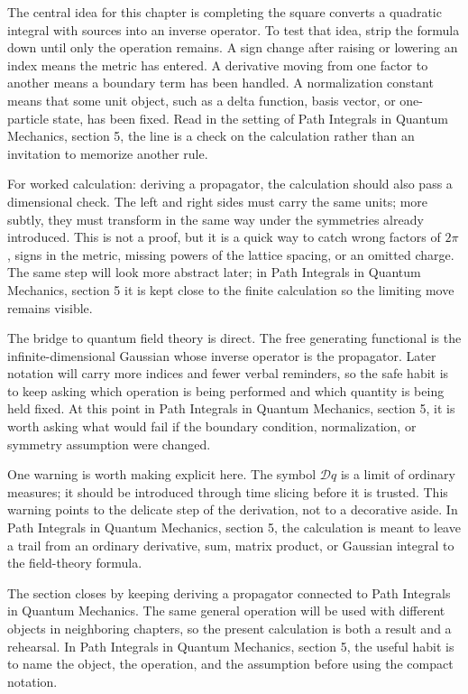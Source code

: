 The central idea for this chapter is completing the square converts a quadratic integral with sources into an inverse operator.  To test that idea, strip the formula down until only the operation remains.  A sign change after raising or lowering an index means the metric has entered.  A derivative moving from one factor to another means a boundary term has been handled.  A normalization constant means that some unit object, such as a delta function, basis vector, or one-particle state, has been fixed.  Read in the setting of Path Integrals in Quantum Mechanics, section 5, the line is a check on the calculation rather than an invitation to memorize another rule.

For worked calculation: deriving a propagator, the calculation should also pass a dimensional check.  The left and right sides must carry the same units; more subtly, they must transform in the same way under the symmetries already introduced.  This is not a proof, but it is a quick way to catch wrong factors of \(2\pi\), signs in the metric, missing powers of the lattice spacing, or an omitted charge.  The same step will look more abstract later; in Path Integrals in Quantum Mechanics, section 5 it is kept close to the finite calculation so the limiting move remains visible.

The bridge to quantum field theory is direct.  The free generating functional is the infinite-dimensional Gaussian whose inverse operator is the propagator.  Later notation will carry more indices and fewer verbal reminders, so the safe habit is to keep asking which operation is being performed and which quantity is being held fixed.  At this point in Path Integrals in Quantum Mechanics, section 5, it is worth asking what would fail if the boundary condition, normalization, or symmetry assumption were changed.

One warning is worth making explicit here.  The symbol \(\mathcal D q\) is a limit of ordinary measures; it should be introduced through time slicing before it is trusted.  This warning points to the delicate step of the derivation, not to a decorative aside.  In Path Integrals in Quantum Mechanics, section 5, the calculation is meant to leave a trail from an ordinary derivative, sum, matrix product, or Gaussian integral to the field-theory formula.

The section closes by keeping deriving a propagator connected to Path Integrals in Quantum Mechanics.  The same general operation will be used with different objects in neighboring chapters, so the present calculation is both a result and a rehearsal.  In Path Integrals in Quantum Mechanics, section 5, the useful habit is to name the object, the operation, and the assumption before using the compact notation.



